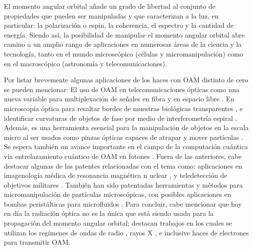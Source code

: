 El momento angular orbital añade un grado de libertad al
conjunto de propiedades que pueden ser manipuladas y que caracterizan
a la luz, en particular: la polarización o espin, la coherencia, el
espectro y la cantidad de energía. Siendo así, la posibilidad de manipular el
momento angular orbital abre camino a un amplio rango de aplicaciones
en numerosas áreas de la ciencia y la tecnología, tanto en el mundo
microscópico (células y micromanipulación) como en el macroscópico
(astronomía y telecomunicaciones).  

Por listar brevemente algunas aplicaciones de los haces
con OAM distinto de cero se pueden mencionar: El uso de OAM en
telecomunicaciones ópticas como una nueva variable para 
multiplexación de señales en fibra y en espacio libre 
. En microscopía
óptica para resaltar bordes de muestras biológicas transparentes , e identificar
curvaturas de objetos de fase por medio de interferometría espiral
. Además, es una herramienta esencial para la
manipulación de objetos en la escala micro al ser usados como pinzas ópticas capaces
de atrapar y mover partículas . Se espera también
un avance importante en el campo de la computación cuántica vía
entrelazamiento cuántico de OAM en fotones . Fuera de
las anteriores, cabe destacar algunas de las patentes relacionadas
con el tema como: aplicaciones en imagenología médica de resonancia magnética
n uclear , y teledetección de objetivos militares
. También han sido patentadas herramientas y métodos
para micromanipulación de partículas microscópicas, con
posibles aplicaciones en bombas peristálticas para microfluidos
. Para concluir, cabe mencionar  que hoy
en día la radiación óptica no es la única que está siendo usada  
para la propagación del momento angular orbital; destacan trabajos en
los cuales se utilizan los regímenes de ondas de radio
, rayos X , e inclusive haces de
electrones  para transmitir OAM. \\

